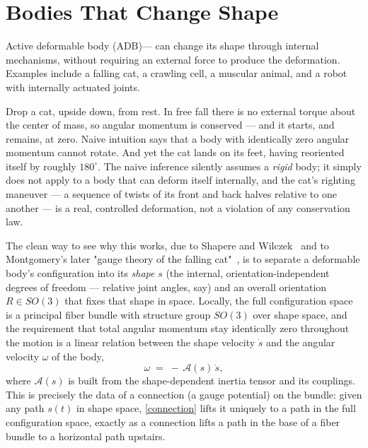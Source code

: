 \chapter{Bodies That Change Shape}
\label{ch:shape}

Active deformable body (ADB)— can change its shape through internal mechanisms,
without requiring an external force to produce the deformation. Examples
include a falling cat, a crawling cell, a muscular animal, and a robot with 
internally actuated joints.

Drop a cat, upside down, from rest. In free fall there is no
external torque about the center of mass, so angular momentum is
conserved --- and it starts, and remains, at zero. Naive intuition
says that a body with identically zero angular momentum cannot
rotate. And yet the cat lands on its feet, having reoriented itself
by roughly $180^\circ$. The naive inference silently assumes a
\emph{rigid} body; it simply does not apply to a body that can
deform itself internally, and the cat's righting maneuver --- a
sequence of twists of its front and back halves relative to one
another --- is a real, controlled deformation, not a violation of
any conservation law.

The clean way to see why this works, due to Shapere and
Wilczek~\cite{shapere+wilczek} and to Montgomery's later "gauge
theory of the falling cat"~\cite{montgomery}, is to separate a
deformable body's configuration into its \emph{shape} $s$ (the
internal, orientation-independent degrees of freedom --- relative
joint angles, say) and an overall orientation $R\in SO(3)$ that fixes
that shape in space. Locally, the full configuration space is a
principal fiber bundle with structure group $SO(3)$ over shape space,
and the requirement that total angular momentum stay identically
zero throughout the motion is a linear relation between the shape
velocity $\dot s$ and the angular velocity $\omega$ of the body,
\begin{equation}
  \omega \;=\; -\,\mathcal A(s)\,\dot s ,
  \label{connection}
\end{equation}
where $\mathcal A(s)$ is built from the shape-dependent inertia
tensor and its couplings. This is precisely the data of a connection
(a gauge potential) on the bundle: given any path $s(t)$ in shape
space, \eqref{connection} lifts it uniquely to a path in the full
configuration space, exactly as a connection lifts a path in the
base of a fiber bundle to a horizontal path upstairs.


